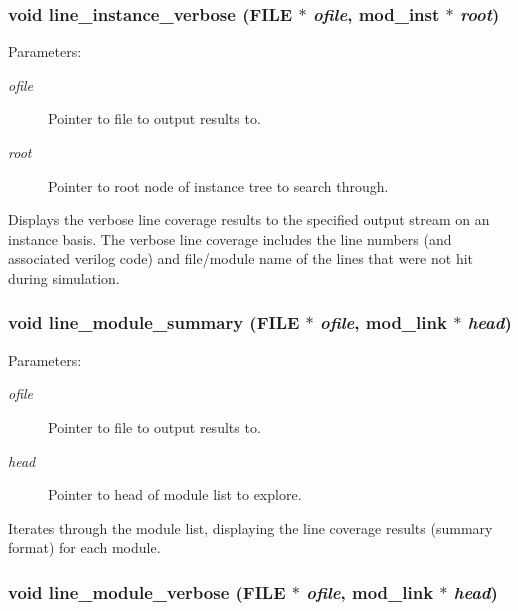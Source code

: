 \subsubsection{\setlength{\rightskip}{0pt plus 5cm}void line\_\-instance\_\-verbose (FILE $\ast$ {\em ofile}, {\bf mod\_\-inst} $\ast$ {\em root})}\label{line_8c_a6}


\begin{Desc}
\item[Parameters: ]\par
\begin{description}
\item[{\em 
ofile}]Pointer to file to output results to. \item[{\em 
root}]Pointer to root node of instance tree to search through.\end{description}
\end{Desc}
Displays the verbose line coverage results to the specified output stream on an instance basis. The verbose line coverage includes the line numbers  (and associated verilog code) and file/module name of the lines that were  not hit during simulation. 
\subsubsection{\setlength{\rightskip}{0pt plus 5cm}void line\_\-module\_\-summary (FILE $\ast$ {\em ofile}, {\bf mod\_\-link} $\ast$ {\em head})}\label{line_8c_a4}


\begin{Desc}
\item[Parameters: ]\par
\begin{description}
\item[{\em 
ofile}]Pointer to file to output results to. \item[{\em 
head}]Pointer to head of module list to explore.\end{description}
\end{Desc}
Iterates through the module list, displaying the line coverage results (summary format) for each module. 
\subsubsection{\setlength{\rightskip}{0pt plus 5cm}void line\_\-module\_\-verbose (FILE $\ast$ {\em ofile}, {\bf mod\_\-link} $\ast$ {\em head})}\label{line_8c_a7}


